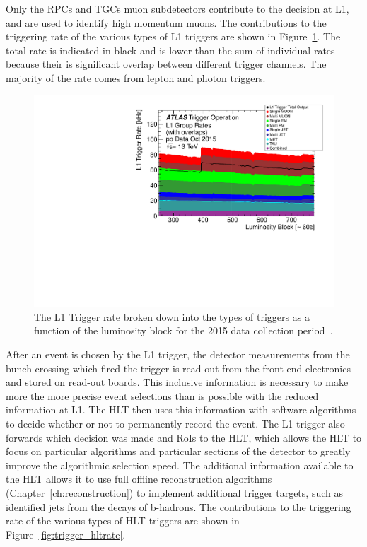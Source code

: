 Only the \acp{RPC} and \acp{TGC} muon subdetectors contribute to the decision at \ac{L1}, and are used to identify high momentum muons.
The contributions to the triggering rate of the various types of \ac{L1} triggers are shown in Figure~\ref{fig:trigger_l1rate}. 
The total rate is indicated in black and is lower than the sum of individual rates because their is significant overlap between different trigger channels. 
The majority of the rate comes from lepton and photon triggers.

\begin{figure}[hbtp]
\includegraphics[width=\fullfig]{figures/trigger_l1rate.pdf}
\caption{The \acs*{L1} Trigger rate broken down into the types of triggers as a function of the luminosity block for the 2015 data collection period~\cite{ATL-DAQ-PUB-2016-001}.}
\label{fig:trigger_l1rate}
\end{figure}

After an event is chosen by the \ac{L1} trigger, the detector measurements from the bunch crossing which fired the trigger is read out from the front-end electronics and stored on read-out boards.
This inclusive information is necessary to make more the more precise event selections than is possible with the reduced information at \ac{L1}.
The \ac{HLT} then uses this information with software algorithms to decide whether or not to permanently record the event.
The \ac{L1} trigger also forwards which decision was made and \acp{RoI} to the \ac{HLT}, which allows the \ac{HLT} to focus on particular algorithms and particular sections of the detector to greatly improve the algorithmic selection speed.
The additional information available to the \ac{HLT} allows it to use full offline reconstruction algorithms (Chapter~\ref{ch:reconstruction}) to implement additional trigger targets, such as identified jets from the decays of b-hadrons.
The contributions to the triggering rate of the various types of \ac{HLT} triggers are shown in Figure~\ref{fig:trigger_hltrate}. 

